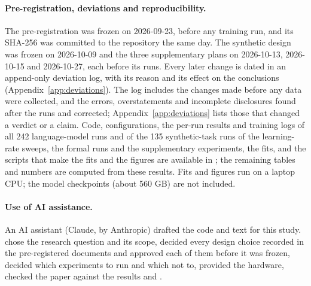 \paragraph{Pre-registration, deviations and reproducibility.} The pre-registration was frozen on 2026-09-23, before any
training run, and its SHA-256 was committed to the repository the same day. The synthetic design was frozen on
2026-10-09 and the three supplementary plans on 2026-10-13, 2026-10-15 and 2026-10-27, each before its runs. Every later
change is dated in an append-only deviation log, with its reason and its effect on the conclusions
(Appendix~\ref{app:deviations}). The log includes the changes made before any data were collected, and the errors, overstatements and
incomplete disclosures found after the runs and corrected; Appendix~\ref{app:deviations} lists those that changed a
verdict or a claim. Code, configurations, the per-run results and training logs of all 242 language-model runs and of the 135
synthetic-task runs of the learning-rate sweeps, the formal runs and the supplementary experiments, the fits, and the scripts that make the
fits and the figures are available in \coderepo; the remaining tables and numbers are computed from these results. Fits
and figures run on a laptop CPU; the model checkpoints (about 560 GB) are not included.

\paragraph{Use of AI assistance.}
An AI assistant (Claude, by Anthropic) drafted the code and text for this study. \Theauthors{} chose the research
question and its scope, decided every design choice recorded in the pre-registered documents and approved each of them
before it was frozen, decided which experiments to run and which not to, provided the hardware, checked the paper against
the results and \respons.
